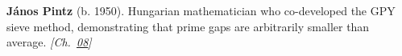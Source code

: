 \textbf{János Pintz} (b. 1950). Hungarian mathematician who co-developed the GPY sieve method, demonstrating that prime gaps are arbitrarily smaller than average. \emph{[Ch.~\hyperref[ch:boundedprimegaps]{08}]}

